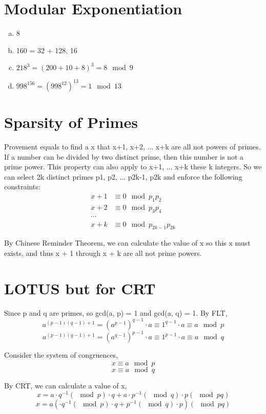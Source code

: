 \documentclass{article}
\begin{document}
\part*{Modular Exponentiation}
    \begin{enumerate}[(a).]
        \item 8
        \item 160 = 32 + 128, 16
        \item $218^3 = (200 + 10 + 8)^3 = 8 \mod{9}$
        \item $998^156 = (998^12)^13 = 1 \mod{13}$
    \end{enumerate}    

\part*{Sparsity of Primes}
Provement equals to find a x that x+1, x+2, ... x+k are all not powers of primes. 
If a number can be divided by two distinct prime, then this number is not a prime power.  
This property can also apply to x+1, ... x+k these k integers. So we can select 2k distinct primes 
p1, p2, ... p2k-1, p2k and enforce the following constraints:\\

\begin{align*}
    x + 1 &\equiv 0 \mod{p_1p_2}\\
    x + 2 &\equiv 0 \mod{p_3p_4}\\
    \cdots\\
    x + k &\equiv 0 \mod{p_{2k-1}p_{2k}}
\end{align*}

By Chinese Reminder Theorem, we can calculate the value of x 
so this x must exists, and thus x + 1 through x + k are all not prime powers. 


\part*{LOTUS but for CRT}
Since p and q are primes, so gcd(a, p) = 1 and gcd(a, q) = 1. 
By FLT,
\[a^{(p-1)(q-1)+1} = (a^{p-1})^{q-1} \cdot a \equiv 1^{q-1} \cdot a \equiv a \mod{p} \]
\[a^{(p-1)(q-1)+1} = (a^{q-1})^{p-1} \cdot a \equiv 1^{p-1} \cdot a \equiv a \mod{q} \]

Consider the system of congruences,
\[x \equiv a \mod{p}\]
\[x \equiv a \mod{q}\]

By CRT, we can calculate a value of x,
\[x = a\cdot q^{-1}(\mod{p}) \cdot q + a\cdot p^{-1}(\mod{q})\cdot p (\mod{pq})\]
\[x = a(\cdot q^{-1}(\mod{p}) \cdot q + p^{-1}(\mod{q})\cdot p) (\mod{pq})\]
\end{document}
